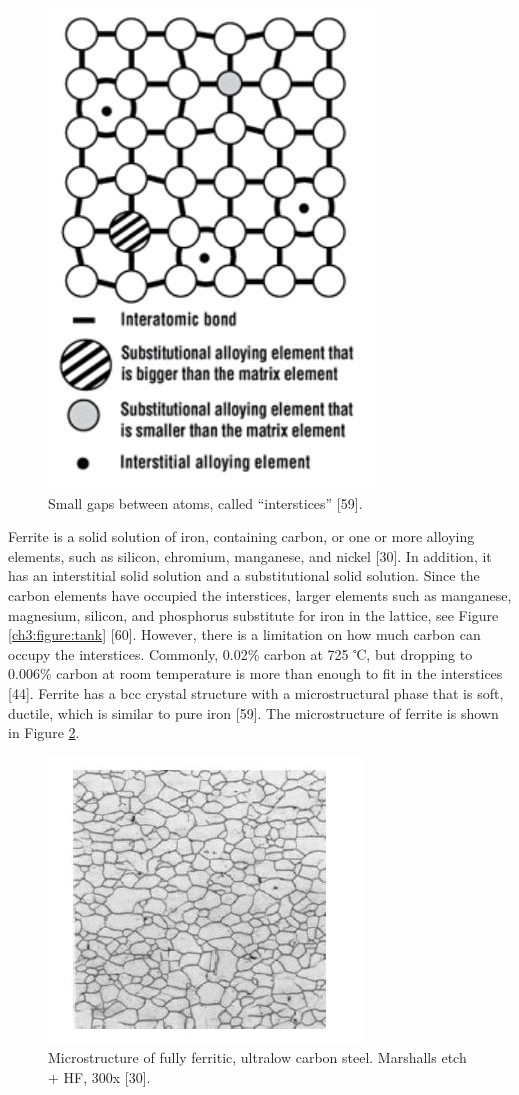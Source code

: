 \documentclass[12pt]{report}
\begin{document}
\begin{figure}[H]
    \centering
    \includegraphics[width=.5\textwidth]{small_gaps_between_atoms.jpg}
    \caption{Small gaps between atoms, called “interstices” [59].}
    \label{ch3:figure:gaps}
\end{figure}

Ferrite is a solid solution of iron, containing carbon, or one or more alloying elements, such as silicon, chromium, manganese, and nickel [30]. In addition, it has an interstitial solid solution and a substitutional solid solution. Since the carbon elements have occupied the interstices, larger elements such as manganese, magnesium, silicon, and phosphorus substitute for iron in the lattice, see Figure \ref{ch3:figure:tank} [60]. However, there is a limitation on how much carbon can occupy the interstices. Commonly, 0.02\% carbon at 725 ℃, but dropping to 0.006\% carbon at room temperature is more than enough to fit in the interstices [44]. Ferrite has a bcc crystal structure with a microstructural phase that is soft, ductile, which is similar to pure iron [59]. The microstructure of ferrite is shown in Figure \ref{ch3:figure:microstructure}.

\begin{figure}[H]
    \centering
    \includegraphics[width=.5\textwidth]{microstructure_of_carbon_steel.jpg}
    \caption{Microstructure of fully ferritic, ultralow carbon steel. Marshalls etch + HF, 300x [30].}
    \label{ch3:figure:microstructure}
\end{figure}
\end{document}
